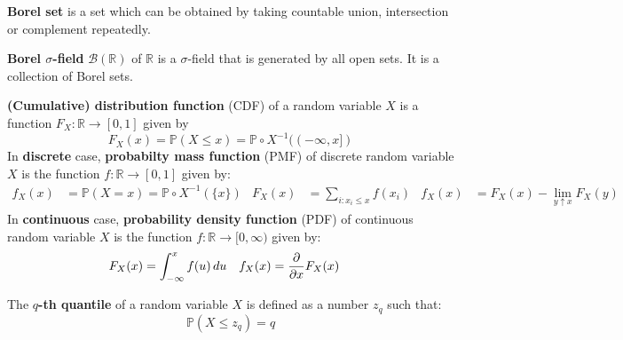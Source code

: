 \documentclass{huhtakm-template-book}
\newcommand{\prob}{\mathbb{P}}
\begin{document}
\begin{sdefn}
	\textbf{Borel set} is a set which can be obtained by taking countable union, intersection or complement repeatedly.
\end{sdefn}
\begin{sdefn}
	\textbf{Borel $\sigma$-field} $\mathcal{B}(\mathbb{R})$ of $\mathbb{R}$ is a $\sigma$-field that is generated by all open sets. It is a collection of Borel sets.
\end{sdefn}
\begin{sdefn}
	\textbf{(Cumulative) distribution function} (CDF) of a random variable $X$ is a function $F_{X}:\mathbb{R}\to[0,1]$ given by
	\begin{equation*}
		F_{X}(x)=\prob(X\leq x)=\prob\circ X^{-1}((-\infty,x])
	\end{equation*}
	In \textbf{discrete} case, \textbf{probabilty mass function} (PMF) of discrete random variable $X$ is the function $f:\mathbb{R}\to[0,1]$ given by:
	\begin{align*}
		f_{X}(x)&=\prob(X=x)=\prob\circ X^{-1}(\{x\}) & F_{X}(x)&=\sum_{i:x_{i}\leq x}f(x_{i}) & f_{X}(x)&=F_{X}(x)-\lim_{y\uparrow x}F_{X}(y)
	\end{align*}
	In \textbf{continuous} case, \textbf{probability density function} (PDF) of continuous random variable $X$ is the function $f:\mathbb{R}\to[0,\infty)$ given by:
	\begin{align*}
		F_{X}(x)&=\int_{-\infty}^{x}f(u)\,du & f_{X}(x)&=\pdv*{F_{X}(x)}{x}
	\end{align*}
\end{sdefn}
\begin{sdefn}
	The \textbf{$q$-th quantile} of a random variable $X$ is defined as a number $z_{q}$ such that:
	\begin{equation*}
		\prob(X\leq z_{q})=q
	\end{equation*}
\end{sdefn}
\end{document}
